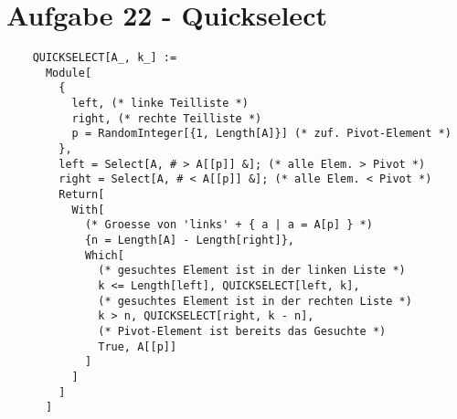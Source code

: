 \section*{Aufgabe 22 - Quickselect}
  \newcommand{\meanv}{\overline{v}}
  \lstset{ %
    language=Mathematica,
    basicstyle=\small,
    numbers=left,
    numberstyle=\small,
    numbersep=-9pt
  }
  \begin{lstlisting}
    QUICKSELECT[A_, k_] :=
      Module[
        {
          left, (* linke Teilliste *)
          right, (* rechte Teilliste *)
          p = RandomInteger[{1, Length[A]}] (* zuf. Pivot-Element *)
        },
        left = Select[A, # > A[[p]] &]; (* alle Elem. > Pivot *)
        right = Select[A, # < A[[p]] &]; (* alle Elem. < Pivot *)
        Return[
          With[
            (* Groesse von 'links' + { a | a = A[p] } *)
            {n = Length[A] - Length[right]},
            Which[
              (* gesuchtes Element ist in der linken Liste *)
              k <= Length[left], QUICKSELECT[left, k],
              (* gesuchtes Element ist in der rechten Liste *)
              k > n, QUICKSELECT[right, k - n],
              (* Pivot-Element ist bereits das Gesuchte *)
              True, A[[p]]
            ]
          ]
        ]
      ]
  \end{lstlisting}

